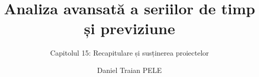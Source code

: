 \title[Analiza avansată a seriilor de timp și previziune]{Analiza avansată a seriilor de timp și previziune}
\subtitle{Capitolul 15: Recapitulare și susținerea proiectelor}
\author[D.T. Pele]{Daniel Traian PELE}
\date{}

\providecommand{\atsapplink}[3]{\hypertarget{#2}{}\hyperlink{#1}{\beamergotobutton{#3}}}  %
\providecommand{\atsappback}[2]{\begin{tikzpicture}[remember picture,overlay]\node[anchor=south east] at ([xshift=-3mm,yshift=7mm]current page.south east){\hyperlink{#1}{\beamerreturnbutton{#2}}};\end{tikzpicture}}  %
\providecommand{\atschlink}[2]{\href{#1}{#2}}  %
\providecommand{\atschlinkt}[2]{\href{#1}{\usebeamercolor[fg]{frametitle}#2}}  %


